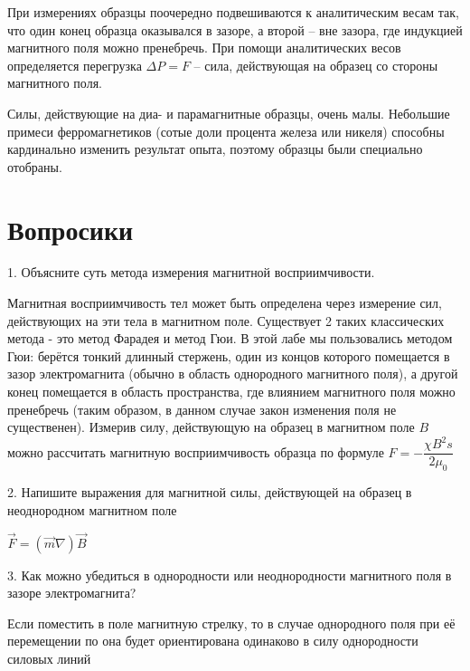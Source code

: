 \documentclass[a4paper,14pt]{article}
\begin{document}
При измерениях образцы поочередно подвешиваются к аналитическим весам так, что один конец образца оказывался в зазоре, а второй -- вне зазора, где индукцией магнитного поля можно пренебречь. При помощи аналитических весов определяется перегрузка $\Delta P = F$ -- сила, действующая на образец со стороны магнитного поля.

Силы, действующие на диа- и парамагнитные образцы, очень малы. Небольшие примеси ферромагнетиков (сотые доли процента железа или никеля) способны кардинально изменить результат опыта, поэтому образцы были специально отобраны.

\newpage

\section*{Вопросики}

1. Объясните суть метода измерения магнитной восприимчивости.
\vspace{5mm}

Магнитная восприимчивость тел может быть определена через измерение сил, действующих на эти тела в магнитном поле. Существует 2 таких классических метода - это метод Фарадея и метод Гюи. В этой лабе мы пользовались методом Гюи: берётся тонкий длинный стержень, один из концов которого помещается в зазор электромагнита (обычно в область однородного магнитного поля), а другой конец помещается в область пространства, где влиянием магнитного поля можно пренебречь (таким образом, в данном случае закон изменения поля не существенен). Измерив силу, действующую на образец в магнитном поле $B$ можно рассчитать магнитную восприимчивость образца по формуле $F = -\dfrac{\chi B^2 s}{2\mu_0}$

\vspace{5mm}

2. Напишите выражения для магнитной силы, действующей на образец в неоднородном магнитном поле

\vspace{5mm}

$\vec F = (\vec m \nabla)\vec B$

\vspace{5mm}

3. Как можно убедиться в однородности или неоднородности магнитного поля в зазоре электромагнита?

\vspace{5mm}

Если поместить в поле магнитную стрелку, то в случае однородного поля при её перемещении по она будет ориентирована одинаково в силу однородности силовых линий
\end{document}
